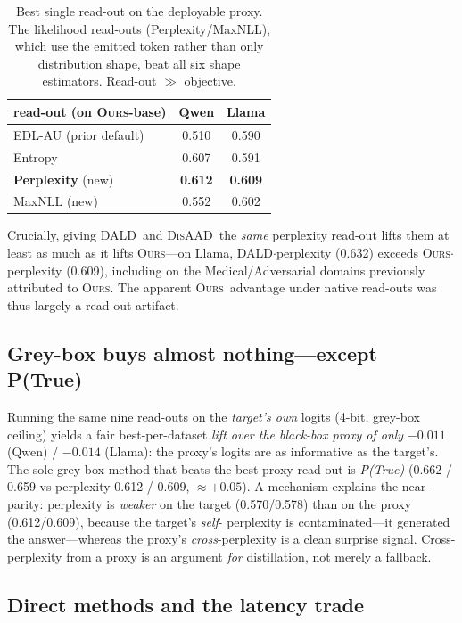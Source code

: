 \documentclass[11pt]{article}
\newcommand{\ours}{\textsc{Ours}}
\newcommand{\dald}{\textsc{DALD}}
\newcommand{\disaad}{\textsc{DisAAD}}
\newcommand{\best}[1]{\textbf{#1}}
\begin{document}
\begin{table}[t]\centering\small
\begin{tabular}{l cc}
\toprule
read-out (on \ours-base) & Qwen & Llama\\
\midrule
EDL-AU (prior default)   & 0.510 & 0.590\\
Entropy                  & 0.607 & 0.591\\
\textbf{Perplexity} (new)& \best{0.612} & \best{0.609}\\
MaxNLL (new)             & 0.552 & 0.602\\
\bottomrule
\end{tabular}
\caption{Best single read-out on the deployable proxy. The likelihood read-outs
(Perplexity/MaxNLL), which use the emitted token rather than only distribution shape,
beat all six shape estimators. Read-out $\gg$ objective.}
\label{tab:readout}
\end{table}

Crucially, giving \dald\ and \disaad\ the \emph{same} perplexity read-out lifts them at
least as much as it lifts \ours---on Llama, \dald$\cdot$perplexity (0.632) exceeds
\ours$\cdot$perplexity (0.609), including on the Medical/Adversarial domains previously
attributed to \ours. The apparent \ours\ advantage under native read-outs was thus
largely a read-out artifact.

\subsection{Grey-box buys almost nothing---except P(True)}\label{sec:greybox}

Running the same nine read-outs on the \emph{target's own} logits (4-bit, grey-box
ceiling) yields a fair best-per-dataset \emph{lift over the black-box proxy of only}
$-0.011$ (Qwen) / $-0.014$ (Llama): the proxy's logits are as informative as the
target's. The sole grey-box method that beats the best proxy read-out is
\emph{P(True)} (0.662 / 0.659 vs perplexity 0.612 / 0.609, $\approx{+}0.05$). A
mechanism explains the near-parity: perplexity is \emph{weaker} on the target
(0.570/0.578) than on the proxy (0.612/0.609), because the target's \emph{self}-%
perplexity is contaminated---it generated the answer---whereas the proxy's
\emph{cross}-perplexity is a clean surprise signal. Cross-perplexity from a proxy is an
argument \emph{for} distillation, not merely a fallback.

\subsection{Direct methods and the latency trade}
\end{document}

